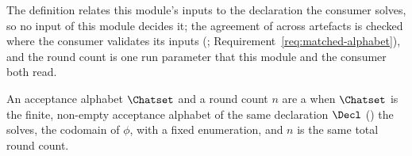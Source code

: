 
The definition relates this module's inputs to the declaration the consumer
solves, so no input of this module decides it; the agreement of
 across artefacts is checked where
the consumer validates its inputs
(;
Requirement~\ref{req:matched-alphabet}), and the round count is one run
parameter that this module and the consumer both read.

\begin{definition}\label{def:matched-alphabet}
An acceptance alphabet $\Chatset$ and a round count $n$ are a
 when $\Chatset$ is the finite, non-empty acceptance alphabet of
the same declaration $\Decl$ () the
 solves, the codomain of $\phi$, with a fixed enumeration, and
$n$ is the same total round count.
\end{definition}
